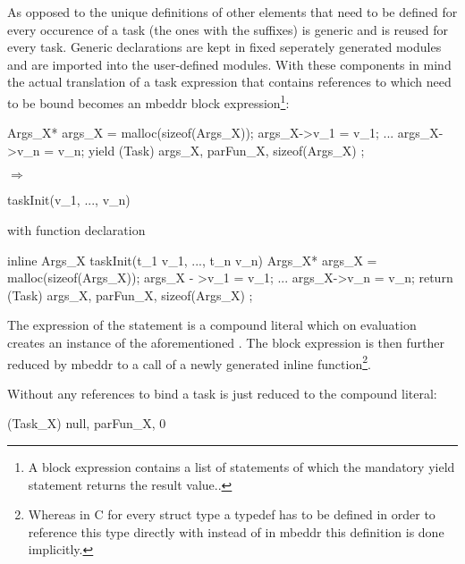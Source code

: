 As opposed to the unique definitions of other elements that need to be defined for every occurence of a task (the ones with the  suffixes)  is generic and is reused for every task. Generic declarations are kept in fixed seperately generated modules and are imported into the user-defined modules.
With these components in mind the actual translation of a task expression  that contains references  to  which need to be bound becomes an mbeddr block expression\footnote{A block expression contains a list of statements of which the mandatory yield statement returns the result value..}:

\begin{center}
\begin{minipage}{0.4\textwidth}
\begin{ccode}
{
  Args_X* args_X = malloc(sizeof(Args_X));
  args_X->v_1 = v_1;
  ...
  args_X->v_n = v_n;
  yield (Task){ args_X, parFun_X, sizeof(Args_X) };
}
\end{ccode}
\end{minipage}
\quad$\Longrightarrow$\qquad
\begin{minipage}{0.4\textwidth}
\begin{ccode}
taskInit(v_1, ..., v_n)
\end{ccode}
with function declaration
\begin{ccode}
inline Args_X taskInit(t_1 v_1, ..., t_n v_n) {
  Args_X* args_X = malloc(sizeof(Args_X));
  args_X - >v_1 = v_1;
  ...
  args_X->v_n = v_n;
  return (Task){ args_X, parFun_X, sizeof(Args_X) };
}
\end{ccode}
\end{minipage}
\end{center}

The expression of the  statement is a compound literal which on evaluation creates an instance of the aforementioned . The block expression is then further reduced by mbeddr to a call of a newly generated inline function\footnote{Whereas in C for every struct type  a typedef has to be defined in order to reference this type directly with  instead of  in mbeddr this definition is done implicitly.}.

Without any references to bind a task is just reduced to the compound literal:

\begin{ccode}
(Task_X){ null, parFun_X, 0 }
\end{ccode}

